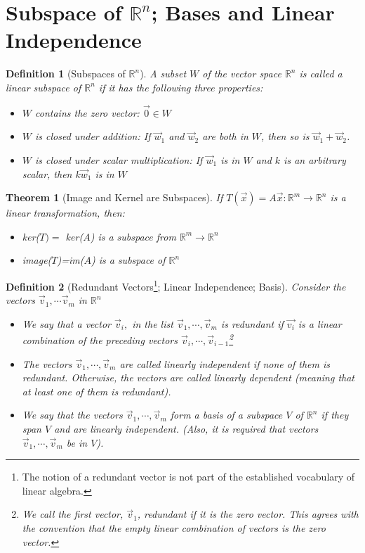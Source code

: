 \documentclass[10pt]{report}
\newtheorem{thm2}{Theorem}[section]
\newtheorem{def2}{Definition}[section]
\begin{document}
\section{Subspace of $\mathbb{R}^n$; Bases and Linear Independence}
\begin{def2}[Subspaces of $\mathbb{R}^n$]
A subset $W$ of the vector space $\mathbb{R}^n$ is called a linear \textit{subspace} of $\mathbb{R}^n$ if it has the following three properties:
\begin{itemize}
\item[1.] $W$ contains the zero vector: $\vec{0}\in W$
\item[2.] $W$ is closed under addition: If $\vec{w}_1$ and $\vec{w}_2$ are both in $W$, then so is $\vec{w}_1 + \vec{w}_2$.
\item[3.] $W$ is closed under scalar multiplication: If $\vec{w}_1$ is in $W$ and $k$ is an arbitrary scalar, then $k\vec{w}_1$ is in $W$
\end{itemize}
\end{def2}
\begin{thm2}[Image and Kernel are Subspaces]
If $T(\vec{x})=A\vec{x}:\mathbb{R}^m \to \mathbb{R}^n$ is a linear transformation, then:
\begin{itemize}
\item ker($T)=$ ker($A$) is a subspace from $\mathbb{R}^m \to \mathbb{R}^n$
\item image($T$)=im($A$) is a subspace of $\mathbb{R}^n$
\end{itemize}
\end{thm2}
\begin{def2}[Redundant Vectors\footnote{The notion of a redundant vector is not part of the established vocabulary of linear algebra.}; Linear Independence; Basis]
Consider the vectors $\vec{v}_1, \cdots \vec{v}_m$ in $\mathbb{R}^n$
\begin{itemize}
\item[1.] We say that a vector $\vec{v}_i,$ in the list $\vec{v}_1, \cdots , \vec{v}_m$ is \textit{redundant} if $\vec{v_i}$ is a linear combination of the preceding vectors $\vec{v}_i, \cdots ,\vec{v}_{i-1}$\footnote{We call the first vector, $\vec{v}_1$, redundant if it is the zero vector. This agrees with the convention that the empty linear combination of vectors is the zero vector.}
\item[2.] The vectors $\vec{v}_1, \cdots, \vec{v}_m$ are called linearly independent if none of them is redundant. Otherwise, the vectors are called linearly dependent (meaning that at least one of them is redundant).
\item[3.] We say that the vectors $\vec{v}_1, \cdots, \vec{v}_m$ form a basis of a subspace $V$ of $\mathbb{R}^n$ if they span $V$ and are linearly independent. (Also, it is required that vectors $\vec{v}_1, \cdots, \vec{v}_m$ be in $V$).
\end{itemize}
\end{def2}
\end{document}
